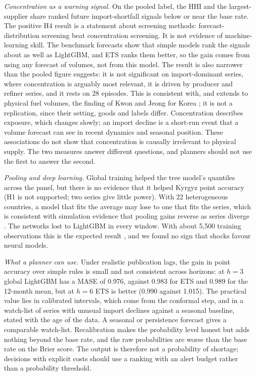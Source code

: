\documentclass[conference]{IEEEtran}
\begin{document}
\textit{Concentration as a warning signal.} On the pooled label, the HHI and the largest-supplier share ranked future import-shortfall signals below or near the base rate. The positive H4 result is a statement about screening methods: forecast-distribution screening beat concentration screening. It is not evidence of machine-learning skill. The benchmark forecasts show that simple models rank the signals about as well as LightGBM, and ETS ranks them better, so the gain comes from using any forecast of volumes, not from this model. The result is also narrower than the pooled figure suggests: it is not significant on import-dominant series, where concentration is arguably most relevant, it is driven by producer and refiner series, and it rests on 28 episodes. This is consistent with, and extends to physical fuel volumes, the finding of Kwon and Jeong for Korea \cite{kwon2026}; it is not a replication, since their setting, goods and labels differ. Concentration describes exposure, which changes slowly; an import decline is a short-run event that a volume forecast can see in recent dynamics and seasonal position. These associations do not show that concentration is causally irrelevant to physical supply. The two measures answer different questions, and planners should not use the first to answer the second.

\textit{Pooling and deep learning.} Global training helped the tree model's quantiles across the panel, but there is no evidence that it helped Kyrgyz point accuracy (H1 is not supported; two series give little power). With 22 heterogeneous countries, a model that fits the average may lose to one that fits the series, which is consistent with simulation evidence that pooling gains reverse as series diverge \cite{montero2021,hewamalage2022}. The networks lost to LightGBM in every window. With about 5,500 training observations this is the expected result \cite{grinsztajn2022}, and we found no sign that shocks favour neural models.

\textit{What a planner can use.} Under realistic publication lags, the gain in point accuracy over simple rules is small and not consistent across horizons: at $h=3$ global LightGBM has a MASE of 0.976, against 0.983 for ETS and 0.989 for the 12-month mean, but at $h=6$ ETS is better (0.990 against 1.015). The practical value lies in calibrated intervals, which come from the conformal step, and in a watch-list of series with unusual import declines against a seasonal baseline, stated with the age of the data. A seasonal or persistence forecast gives a comparable watch-list. Recalibration makes the probability level honest but adds nothing beyond the base rate, and the raw probabilities are worse than the base rate on the Brier score. The output is therefore not a probability of shortage; decisions with explicit costs should use a ranking with an alert budget rather than a probability threshold.
\end{document}
